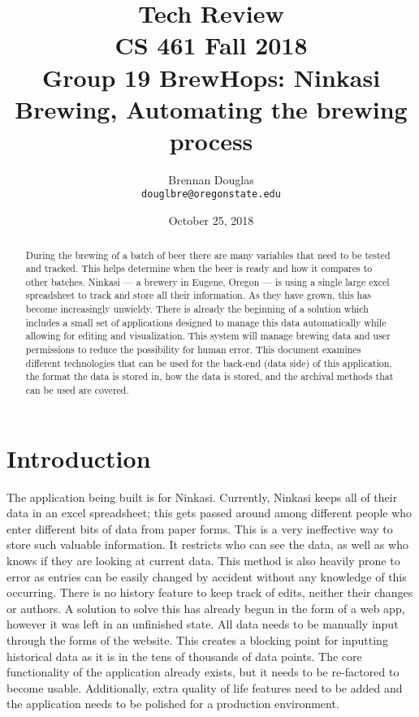 \documentclass[draftclsnofoot,onecolumn,journal,letterpaper,compsoc,10pt]{IEEEtran}
\title{Tech Review\\\large CS 461 Fall 2018\\Group 19 BrewHops: Ninkasi Brewing, Automating the brewing process}
\author{
    Brennan Douglas \\
    \texttt{douglbre@oregonstate.edu}
}
\date{October 25, 2018}
\begin{document}
\begin{titlingpage}
    \maketitle
    \begin{abstract}
    	During the brewing of a batch of beer there are many variables that need to be tested and tracked. This helps determine when the beer is ready and how it compares to other batches. Ninkasi --- a brewery in Eugene, Oregon --- is using a single large excel spreadsheet to track and store all their information. As they have grown, this has become increasingly unwieldy. There is already the beginning of a solution which includes a small set of applications designed to manage this data automatically while allowing for editing and visualization. This system will manage brewing data and user permissions to reduce the possibility for human error. This document examines different technologies that can be used for the back-end (data side) of this application, the format the data is stored in, how the data is stored, and the archival methods that can be used are covered.
    \end{abstract}
    \pagebreak
    \tableofcontents
\end{titlingpage}

\section{Introduction}

The application being built is for Ninkasi.  Currently, Ninkasi keeps all of their data in an excel spreadsheet; this gets passed around among different people who enter different bits of data from paper forms.  This is a very ineffective way to store such valuable information.  It restricts who can see the data, as well as who knows if they are looking at current data.  This method is also heavily prone to error as entries can be easily changed by accident without any knowledge of this occurring.  There is no history feature to keep track of edits, neither their changes or authors.  A solution to solve this has already begun in the form of a web app, however it was left in an unfinished state.  All data needs to be manually input through the forms of the website.  This creates a blocking point for inputting historical data as it is in the tens of thousands of data points.  The core functionality of the application already exists, but it needs to be re-factored to become usable.  Additionally, extra quality of life features need to be added and the application needs to be polished for a production environment.
\end{document}
